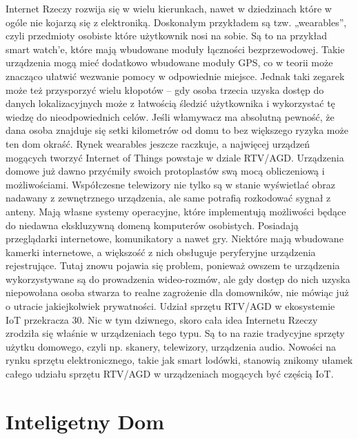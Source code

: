 \documentclass[brudnopis]{xmgr}
\begin{document}
Internet Rzeczy rozwija się w wielu kierunkach, nawet w dziedzinach które w ogóle nie kojarzą się z elektroniką. Doskonałym przykładem są tzw. „wearables”, czyli przedmioty osobiste które użytkownik nosi na sobie. Są to na przykład smart watch'e, które mają wbudowane moduły łączności bezprzewodowej. Takie urządzenia mogą mieć dodatkowo wbudowane moduły GPS, co w teorii może znacząco ułatwić wezwanie pomocy w odpowiednie miejsce. Jednak taki zegarek może też przysporzyć wielu kłopotów – gdy osoba trzecia uzyska dostęp do danych lokalizacyjnych może z łatwością śledzić użytkownika i wykorzystać tę wiedzę do nieodpowiednich celów. Jeśli włamywacz ma absolutną pewność, że dana osoba znajduje się setki kilometrów od domu to bez większego ryzyka może ten dom okraść.
Rynek wearables jeszcze raczkuje, a najwięcej urządzeń mogących tworzyć Internet of Things powstaje w dziale RTV/AGD. Urządzenia domowe już dawno przyćmiły swoich protoplastów swą mocą obliczeniową i możliwościami. Współczesne telewizory nie tylko są w stanie wyświetlać obraz nadawany z zewnętrznego urządzenia, ale same potrafią rozkodować sygnał z anteny. Mają własne systemy operacyjne, które implementują możliwości będące do niedawna ekskluzywną domeną komputerów osobistych. Posiadają przeglądarki internetowe, komunikatory a nawet gry. Niektóre mają wbudowane kamerki internetowe, a większość z nich obsługuje peryferyjne urządzenia rejestrujące. Tutaj znowu pojawia się problem, ponieważ owszem te urządzenia wykorzystywane są do prowadzenia wideo-rozmów, ale gdy dostęp do nich uzyska niepowołana osoba stwarza to realne zagrożenie dla domowników, nie mówiąc już o utracie jakiejkolwiek prywatności.
Udział sprzętu RTV/AGD w ekosystemie IoT przekracza 30. Nic w tym dziwnego, skoro cała idea Internetu Rzeczy zrodziła się właśnie w urządzeniach tego typu. Są to na razie tradycyjne sprzęty użytku domowego, czyli np. skanery, telewizory, urządzenia audio. Nowości na rynku sprzętu elektronicznego, takie jak smart lodówki, stanowią znikomy ułamek całego udziału sprzętu RTV/AGD w urządzeniach mogących być częścią IoT.

\section{Inteligetny Dom}
\end{document}
